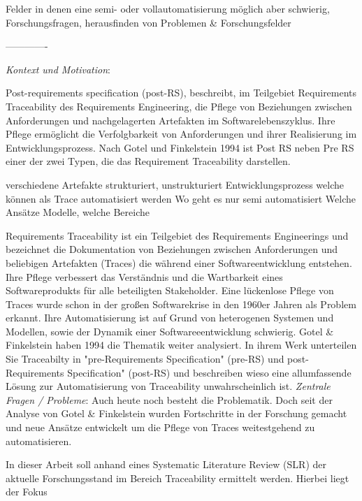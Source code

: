


Felder in denen eine semi- oder vollautomatisierung möglich aber schwierig, Forschungsfragen, herausfinden von Problemen & Forschungsfelder

-------------

\textit{Kontext und Motivation}:

Post-requirements specification (post-RS), beschreibt, im Teilgebiet Requirements Traceability des Requirements Engineering, die Pflege von Beziehungen zwischen Anforderungen und nachgelagerten Artefakten im Softwarelebenszyklus. Ihre Pflege ermöglicht die Verfolgbarkeit von Anforderungen und ihrer Realisierung im Entwicklungsprozess. Nach Gotel und Finkelstein 1994 ist Post RS neben Pre RS einer der zwei Typen, die das Requirement Traceability darstellen.  

verschiedene Artefakte strukturiert, unstrukturiert
Entwicklungsprozess
welche können als Trace automatisiert werden
Wo geht es nur semi automatisiert
Welche Ansätze Modelle, welche Bereiche

Requirements Traceability ist ein Teilgebiet des Requirements Engineerings und bezeichnet die Dokumentation von Beziehungen zwischen Anforderungen und beliebigen Artefakten (Traces) die während einer Softwareentwicklung entstehen. Ihre Pflege verbessert das Verständnis und die Wartbarkeit eines Softwareprodukts für alle beteiligten Stakeholder. Eine lückenlose Pflege von Traces wurde schon in der großen Softwarekrise in den 1960er Jahren als Problem erkannt. Ihre Automatisierung ist auf Grund von heterogenen Systemen und Modellen, sowie der Dynamik einer Softwareeentwicklung schwierig. Gotel \& Finkelstein haben 1994 die Thematik weiter analysiert. In ihrem Werk unterteilen Sie Traceabilty in "pre-Requirements Specification" (pre-RS) und post-Requirements Specification" (post-RS) und beschreiben wieso eine allumfassende Lösung zur Automatisierung von Traceability unwahrscheinlich ist. \textit{Zentrale Fragen / Probleme}: Auch heute noch besteht die Problematik. Doch seit der Analyse von Gotel \& Finkelstein wurden Fortschritte in der Forschung gemacht und neue Ansätze entwickelt um die Pflege von Traces weitestgehend zu automatisieren.  

In dieser Arbeit soll anhand eines Systematic Literature Review (SLR) der aktuelle Forschungsstand im Bereich Traceability ermittelt werden. Hierbei liegt der Fokus

